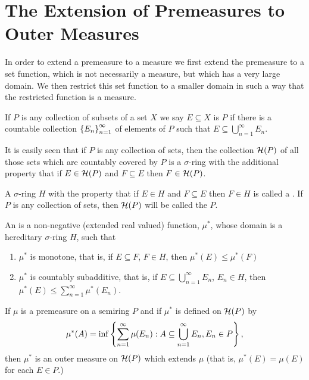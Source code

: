 \section{The Extension of Premeasures to Outer Measures}

In order to extend a premeasure to a measure we first extend the premeasure to a set function, which is not necessarily a measure, but which has a very large domain. We then restrict this set function to a smaller domain in such a way that the restricted function is a measure.

\begin{definition}
If $P$ is any collection of subsets of a set $X$ we say $E\subseteq X$ is  $P$ if there is a countable collection $\left\{E_n\right\}_{n=1}^\infty$ of elements of $P$ such that $E\subseteq\bigcup_{n=1}^\infty E_n$.
\end{definition}

It is easily seen that if $P$ is any collection of sets, then the collection ${\cal H}(P)$ of all those sets which are countably covered by $P$ is a $\sigma$-ring with the additional property that if $E\in{\cal H}(P)$ and $F\subseteq E$ then $F\in{\cal H}(P)$.

\begin{definition}
A $\sigma$-ring $H$ with the property that if $E\in H$ and $F\subseteq E$ then $F\in H$ is called a .
If $P$ is any collection of sets, then ${\cal H}(P)$ will be called the  $P$.
\end{definition}

\begin{definition}
An  is a non-negative (extended real valued) function, $\mu^*$, whose domain is a hereditary $\sigma$-ring $H$, such that
\begin{enumerate}[label=\arabic*)]
    \item\label{def:outer measure 1}
    $\mu^*$ is monotone, that is, if $E\subseteq F$, $F\in H$, then $\mu^*(E)\leq\mu^*(F)$
    \item\label{def:outer measure 2}
    $\mu^*$ is countably subadditive, that is, if $E\subseteq\bigcup_{n=1}^\infty E_n$, $E_n\in H$, then $\mu^*(E)\leq\sum_{n=1}^\infty\mu^*(E_n)$.
\end{enumerate}
\end{definition}

\begin{theorem}\label{thm:outer measure of premeasure}
If $\mu$ is a premeasure on a semiring $P$ and if $\mu^*$ is defined on ${\cal H}(P)$ by \[\mu^*(A)=\inf \left\{\sum_{n=1}^\infty\mu(E_n): A\subseteq\bigcup_{n=1}^\infty E_n, E_n \in P\right\},\] then $\mu^*$ is an outer measure on ${\cal H}(P)$ which extends $\mu$ (that is, $\mu^*(E)=\mu(E)$ for each $E\in P$.)
\end{theorem}

